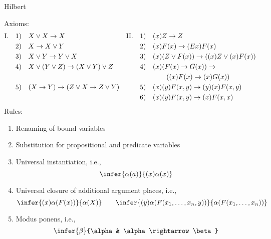 \calculusAcronym{}



\maketitle

\begin{entry}{Hilbert}  

\begin{calculus}
Axioms:
\begin{align*}
\text{I.\quad} 1)\quad & X \lor X \rightarrow X &
\text{II.}\quad 1)\quad & (x)Z \rightarrow Z\\
2) \quad & X \rightarrow X \lor Y &
2) \quad & (x)F(x) \rightarrow (Ex)F(x)\\
3) \quad & X \lor Y \rightarrow Y \lor X &
3) \quad & (x)(Z \lor F(x)) \rightarrow ((x)Z \lor (x)F(x))\\
4) \quad & X \lor (Y \lor Z) \rightarrow (X \lor Y) \lor Z &
4) \quad & (x)(F(x) \rightarrow G(x)) \rightarrow \\
&&& \qquad ((x)F(x) \rightarrow (x)G(x))\\
5) \quad & (X \rightarrow Y) \rightarrow (Z \lor X \rightarrow Z \lor Y) &
5) \quad & (x)(y)F(x, y) \rightarrow (y)(x)F(x, y)\\
&& 6) \quad & (x)(y)F(x, y) \rightarrow (x)F(x, x)
\end{align*}
Rules:
\begin{enumerate}
\item Renaming of bound variables
\item Substitution for propositional and predicate variables
\item Universal instantiation, i.e.,
\[
\infer{\alpha(a)}{(x)\alpha(x)}
\]
\item Universal closure of additional argument places, i.e.,
\[
\infer{(x)\alpha(F(x))}{\alpha(X)}
\qquad
\infer{(y)\alpha(F(x_1, \dots, x_n, y))}{\alpha(F(x_1, \dots, x_n))}
\]
\item Modus ponens, i.e.,
\[
\infer{\beta}{\alpha & \alpha \rightarrow \beta}
\]
\end{enumerate}

\end{calculus}


\end{entry}

